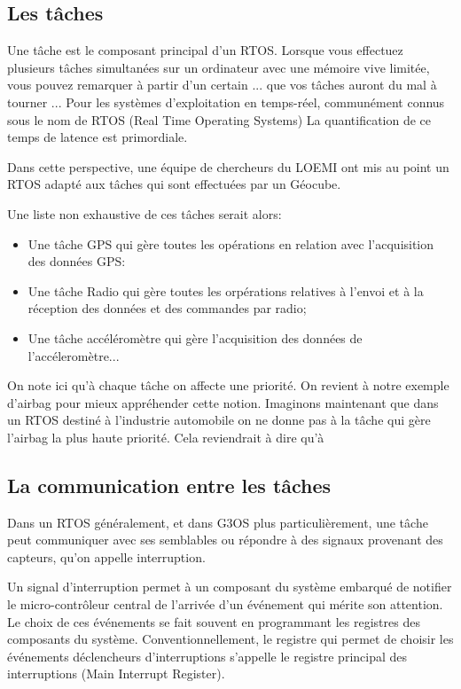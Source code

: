 \documentclass{themeensg}
\begin{document}
\subsection{Les tâches}
Une tâche est le composant principal d'un RTOS. Lorsque vous effectuez plusieurs tâches simultanées sur un ordinateur avec une mémoire vive limitée, vous pouvez remarquer à partir d'un certain ... que vos tâches auront du mal à tourner ... Pour les systèmes d'exploitation en temps-réel, communément connus sous le nom de RTOS (Real Time Operating Systems) La quantification de ce temps de latence est primordiale.

Dans cette perspective, une équipe de chercheurs du LOEMI ont mis au point un RTOS adapté aux tâches qui sont effectuées par un Géocube.

Une liste non exhaustive de ces tâches serait alors:

\begin{itemize}
\item Une tâche GPS qui gère toutes les opérations en relation avec l'acquisition des données GPS:
\item Une tâche Radio qui gère toutes les orpérations relatives à l'envoi et  à la réception des données et des commandes par radio;
\item Une tâche accéléromètre qui gère l'acquisition des données de l'accéleromètre...
\end{itemize}

On note ici qu'à chaque tâche on affecte une priorité. On revient à notre exemple d'airbag pour mieux appréhender cette notion. Imaginons maintenant que dans un RTOS destiné à l'industrie automobile on ne donne pas à la tâche qui gère l'airbag la plus haute priorité. Cela reviendrait à dire qu'à 

\subsection{La communication entre les tâches}

Dans un RTOS généralement, et dans G3OS plus particulièrement, une tâche peut communiquer avec ses semblables ou répondre à des signaux provenant des capteurs, qu'on appelle interruption.

Un signal d'interruption permet à un composant du système embarqué de notifier le micro-contrôleur central de l'arrivée d'un événement qui mérite son attention. Le choix de ces événements se fait souvent en programmant les registres des composants du système. Conventionnellement, le registre qui permet de choisir les événements déclencheurs d'interruptions s'appelle le registre principal des interruptions (Main Interrupt Register).
\end{document}
